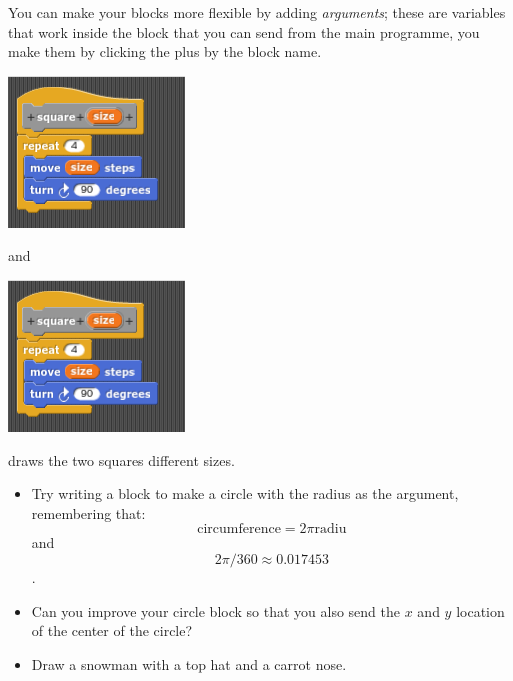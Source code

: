\documentclass[11pt,a4paper]{scrartcl}
\begin{document}
You can make your blocks more flexible by adding \textsl{arguments};
these are variables that work inside the block that you can send from
the main programme, you make them by clicking the plus by the block
name.
\begin{center}
\includegraphics{two_squares_block_size_block.png}
\end{center}
and
\begin{center}
\includegraphics{two_squares_block_size_block.png}
\end{center}
draws the two squares different sizes. 

\begin{itemize}
\item Try writing a block to make a circle with the radius as the
  argument, remembering that:
$$
\mbox{circumference}=2\pi \mbox{radiu}
$$
and $$2\pi / 360 \approx 0.017453$$.
\item Can you improve your circle block so that you also send the $x$ and $y$ location of the center of the circle?
\item Draw a snowman with a top hat and a carrot nose.
\end{itemize}
\end{document}
